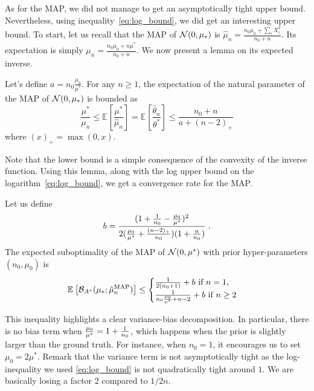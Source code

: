 \documentclass{article}
\newcommand*{\expect}[2][]{\ensuremath{\mathbb{E}_{#1} \left[ #2 \right] }} %
\newcommand{\logpart}{A}
\newcommand{\bregmanconj}{\cB_{\logpart^*}}
\newcommand{\nat}{\theta}
\newcommand{\MAPm}{\hat \mu_n}
\newcommand{\MAPt}{\hat \nat_n}
\begin{document}
As for the MAP, we did not manage to get an asymptotically tight upper bound. Nevertheless, using inequality~\eqref{eq:log_bound}, we did get an interesting upper bound. 
To start, let us recall that the MAP of ${\mathcal N}(0,\mu_*)$ is $\hat \mu_n = \frac{n_0 \mu_0 + \sum_i X_i^2}{n_0 + n}$.
Its expectation is simply $\mu_n= \frac{n_0 \mu_0 + n \mu^*}{n_0 + n}$.
We now present a lemma on its expected inverse.
\begin{lemma}
	Let's define $a=n_0 \frac {\mu_0 }{ \mu^* }$. For any $n\geq 1$, the expectation of the natural parameter of the MAP of ${\mathcal N}(0,\mu_*)$ is bounded as
	\begin{equation}
		\frac{\mu^*}{\mu_n}
		\leq \expect{\frac{\mu^*}{\MAPm}} 
		= \expect{\frac{\MAPt}{\nat^*}} 
		\leq \frac{n_0 +n}{a+ (n-2)_+}
		\label{eq:theta_expectation_bound}
	\end{equation}
	where $(x)_+ = \max(0,x)$.
\end{lemma}
Note that the lower bound is a simple consequence of the convexity of the inverse function. 
Using this lemma, along with the log upper bound on the logarithm~\eqref{eq:log_bound}, we get a convergence rate for the MAP. 
\begin{example}
\begin{theorem}
 Let us  define
 \begin{align}
	b = \frac{(1 + \frac{1}{n_0} - \frac{\mu_0}{\mu^*})^2}{2 (\frac{\mu_0}{\mu^*}+\frac{(n-2)_+}{n_0})(1 + \frac{n}{n_0} )} \; .
 \end{align}
The expected suboptimality of the MAP of ${\mathcal N}(0,\mu^*)$ with prior hyper-parameters $(n_0,\mu_0)$ is
 \begin{equation}
	\expect{\bregmanconj( \mu_*; \hat \mu_n^\text{MAP})}
	\leq \begin{cases}
		\inv{2(n_0+1)}  +  b\ \text{if}\ n=1,\\
		\frac{1}{n_0 \frac{\mu_0}{\mu^*} +n-2} + b \ \text{if}\ n\geq 2
	\end{cases}
	\label{eq:MAP_rate}
\end{equation}
\end{theorem}
\end{example}
This inequality highlights a clear variance-bias decomposition.
In particular, there is no bias term when $\frac{\mu_0}{\mu^*} =1 + \frac{1}{n_0} $, which happens when the prior is slightly larger than the ground truth.  For instance, when $n_0=1$, it encourages us to set $\mu_0 = 2 \mu^*$.
Remark that the variance term is not asymptotically tight as the log-inequality we used \eqref{eq:log_bound} is not quadratically tight around $1$. We are basically losing a factor 2 compared to $1/2n$.
\end{document}
